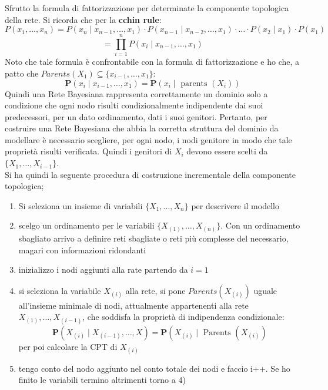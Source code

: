 \message{ !name(modprob.tex)}\documentclass[a4paper,12pt, oneside]{book}
\begin{document}
Sfrutto la formula di fattorizzazione per determinate la
componente topologica della rete. Si ricorda che per la \textbf{cchin rule}:
\small{\[P\left(x_{1}, \ldots, x_{n}\right)=P\left(x_{n} \mid x_{n-1}, \ldots,
      x_{1}\right) \cdot P\left(x_{n-1} \mid x_{n-2}, \ldots, x_{1}\right) \cdot
    \ldots \cdot P\left(x_{2} \mid x_{1}\right) \cdot
    P\left(x_{1}\right)\]\[
    =\prod_{i=1}^n P\left(x_{i} \mid x_{n-1}, \ldots,
      x_{1}\right)\]}
Noto che tale formula è confrontabile con la formula di fattorizzazione e ho
che, a patto che $Parents(X_1)\subseteq \{x_{i-1},\ldots,x_1\}$:
\[\mathbf{P}\left(x_{i} \mid x_{i-1}, \ldots,
    x_{1}\right)=\mathbf{P}\left(x_{i} \mid \text { parents
    }\left(X_{i}\right)\right)\] 
Quindi una Rete Bayesiana rappresenta correttamente un dominio solo a
condizione che ogni nodo risulti condizionalmente indipendente dai suoi
predecessori, per un dato ordinamento, dati i suoi genitori. Pertanto, per
costruire una Rete Bayesiana che abbia la corretta struttura del dominio da
modellare è necessario scegliere, per ogni nodo, i nodi genitore in modo che
tale proprietà risulti verificata. Quindi i genitori di $X_i$ devono essere
scelti da $\{X_1,\ldots,X_{i-1}\}$.\\
Si ha quindi la seguente procedura di costruzione incrementale della
componente topologica;
\begin{enumerate}
  \item Si seleziona un insieme di variabili $\{X_1,\ldots, X_n\}$ per
  descrivere il modello
  \item scelgo un ordinamento per le variabili $\{X_{(1)},\ldots,
  X_{(n)}\}$. Con un ordinamento sbagliato arrivo a definire reti sbagliate o
  reti più complesse del necessario, magari con informazioni ridondanti
  \item inizializzo i nodi aggiunti alla rate partendo da $i=1$
  \item si seleziona la variabile $X_{(i)}$ alla rete, si pone
  $Parents(X_{(i)})$ uguale all’insieme minimale di nodi, attualmente
  appartenenti alla rete ${X_{(1)},\ldots, X_{(i-1)}}$, che soddisfa la
  proprietà di indipendenza condizionale:
  \[\mathbf{P}\left(X_{(i)} \mid X_{(i-1)}, \ldots,
      X\right)=\mathbf{P}\left(X_{(i)} \mid\right. \text { Parents
    }\left(X_{(i)}\right)\]
  per poi calcolare la CPT di $X_{(i)}$
  \item tengo conto del nodo aggiunto nel conto totale dei nodi e faccio
  i++. Se ho finito le variabili termino altrimenti torno a 4)
\end{enumerate}
\end{document}
